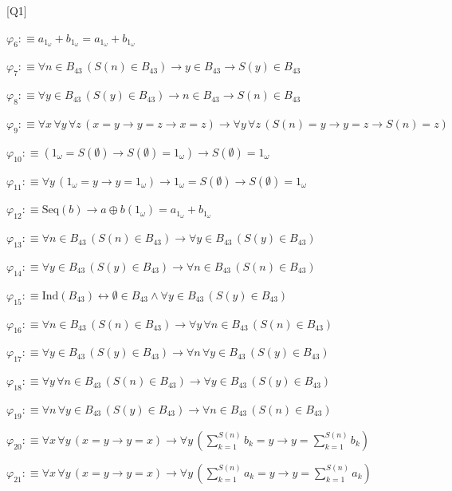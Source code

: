 \begin{fullproof}{[Q1]}
\begin{abbrevlist}
\item $\varphi_{6} :\equiv a_{1_{\omega}} + b_{1_{\omega}} = a_{1_{\omega}} + b_{1_{\omega}}$
\item $\varphi_{7} :\equiv \forall n \in B_{43}\,(S(n) \in B_{43}) \to y \in B_{43} \to S(y) \in B_{43}$
\item $\varphi_{8} :\equiv \forall y \in B_{43}\,(S(y) \in B_{43}) \to n \in B_{43} \to S(n) \in B_{43}$
\item $\varphi_{9} :\equiv \forall x\,\forall y\,\forall z\,(x = y \to y = z \to x = z) \to \forall y\,\forall z\,(S(n) = y \to y = z \to S(n) = z)$
\item $\varphi_{10} :\equiv (1_{\omega} = S(\emptyset) \to S(\emptyset) = 1_{\omega}) \to S(\emptyset) = 1_{\omega}$
\item $\varphi_{11} :\equiv \forall y\,(1_{\omega} = y \to y = 1_{\omega}) \to 1_{\omega} = S(\emptyset) \to S(\emptyset) = 1_{\omega}$
\item $\varphi_{12} :\equiv \mathrm{Seq}(b) \to a \oplus b(1_{\omega}) = a_{1_{\omega}} + b_{1_{\omega}}$
\item $\varphi_{13} :\equiv \forall n \in B_{43}\,(S(n) \in B_{43}) \to \forall y \in B_{43}\,(S(y) \in B_{43})$
\item $\varphi_{14} :\equiv \forall y \in B_{43}\,(S(y) \in B_{43}) \to \forall n \in B_{43}\,(S(n) \in B_{43})$
\item $\varphi_{15} :\equiv \mathrm{Ind}(B_{43}) \leftrightarrow \emptyset \in B_{43} \land \forall y \in B_{43}\,(S(y) \in B_{43})$
\item $\varphi_{16} :\equiv \forall n \in B_{43}\,(S(n) \in B_{43}) \to \forall y\,\forall n \in B_{43}\,(S(n) \in B_{43})$
\item $\varphi_{17} :\equiv \forall y \in B_{43}\,(S(y) \in B_{43}) \to \forall n\,\forall y \in B_{43}\,(S(y) \in B_{43})$
\item $\varphi_{18} :\equiv \forall y\,\forall n \in B_{43}\,(S(n) \in B_{43}) \to \forall y \in B_{43}\,(S(y) \in B_{43})$
\item $\varphi_{19} :\equiv \forall n\,\forall y \in B_{43}\,(S(y) \in B_{43}) \to \forall n \in B_{43}\,(S(n) \in B_{43})$
\item $\varphi_{20} :\equiv \forall x\,\forall y\,(x = y \to y = x) \to \forall y\,({\textstyle\sum_{k=1}^{S(n)} b_{k}} = y \to y = {\textstyle\sum_{k=1}^{S(n)} b_{k}})$
\item $\varphi_{21} :\equiv \forall x\,\forall y\,(x = y \to y = x) \to \forall y\,({\textstyle\sum_{k=1}^{S(n)} a_{k}} = y \to y = {\textstyle\sum_{k=1}^{S(n)} a_{k}})$

\end{abbrevlist}
\end{fullproof}
